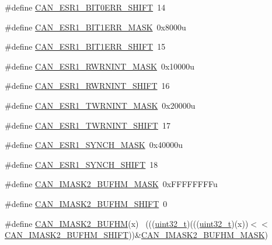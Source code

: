 \begin{DoxyCompactItemize}
\item 
\#define \hyperlink{group___c_a_n___register___masks_ga949e83e6333f8b4ddd5b2fb77585e2e9}{C\+A\+N\+\_\+\+E\+S\+R1\+\_\+\+B\+I\+T0\+E\+R\+R\+\_\+\+S\+H\+I\+FT}~14
\item 
\#define \hyperlink{group___c_a_n___register___masks_ga8a260202c5a157354042a1fba8cbc882}{C\+A\+N\+\_\+\+E\+S\+R1\+\_\+\+B\+I\+T1\+E\+R\+R\+\_\+\+M\+A\+SK}~0x8000u
\item 
\#define \hyperlink{group___c_a_n___register___masks_ga2118504746ecc7ba810d5ed44dd7c31f}{C\+A\+N\+\_\+\+E\+S\+R1\+\_\+\+B\+I\+T1\+E\+R\+R\+\_\+\+S\+H\+I\+FT}~15
\item 
\#define \hyperlink{group___c_a_n___register___masks_gaf0e71745a764581c68a93feef2db8602}{C\+A\+N\+\_\+\+E\+S\+R1\+\_\+\+R\+W\+R\+N\+I\+N\+T\+\_\+\+M\+A\+SK}~0x10000u
\item 
\#define \hyperlink{group___c_a_n___register___masks_gafcbf44277d9766061369a79e2ff761a2}{C\+A\+N\+\_\+\+E\+S\+R1\+\_\+\+R\+W\+R\+N\+I\+N\+T\+\_\+\+S\+H\+I\+FT}~16
\item 
\#define \hyperlink{group___c_a_n___register___masks_gaf6b96813ed300d4649d7daec40351861}{C\+A\+N\+\_\+\+E\+S\+R1\+\_\+\+T\+W\+R\+N\+I\+N\+T\+\_\+\+M\+A\+SK}~0x20000u
\item 
\#define \hyperlink{group___c_a_n___register___masks_ga651c6aee47d004060a9dbc10369cf784}{C\+A\+N\+\_\+\+E\+S\+R1\+\_\+\+T\+W\+R\+N\+I\+N\+T\+\_\+\+S\+H\+I\+FT}~17
\item 
\#define \hyperlink{group___c_a_n___register___masks_ga908135f00230ede2890a9db408908d34}{C\+A\+N\+\_\+\+E\+S\+R1\+\_\+\+S\+Y\+N\+C\+H\+\_\+\+M\+A\+SK}~0x40000u
\item 
\#define \hyperlink{group___c_a_n___register___masks_ga2bd04d8052247b76f7bde4e6d936c0ac}{C\+A\+N\+\_\+\+E\+S\+R1\+\_\+\+S\+Y\+N\+C\+H\+\_\+\+S\+H\+I\+FT}~18
\item 
\#define \hyperlink{group___c_a_n___register___masks_ga9a609dcb1bca8001d83d0c6e4606a454}{C\+A\+N\+\_\+\+I\+M\+A\+S\+K2\+\_\+\+B\+U\+F\+H\+M\+\_\+\+M\+A\+SK}~0x\+F\+F\+F\+F\+F\+F\+F\+Fu
\item 
\#define \hyperlink{group___c_a_n___register___masks_ga0d2a12288f44224a38a4d784903838bb}{C\+A\+N\+\_\+\+I\+M\+A\+S\+K2\+\_\+\+B\+U\+F\+H\+M\+\_\+\+S\+H\+I\+FT}~0
\item 
\#define \hyperlink{group___c_a_n___register___masks_ga7842e9875d6cdb9f94beb0ce81cc5f95}{C\+A\+N\+\_\+\+I\+M\+A\+S\+K2\+\_\+\+B\+U\+F\+HM}(x)                                        ~(((\hyperlink{_p_e___types_8h_a33594304e786b158f3fb30289278f5af}{uint32\+\_\+t})(((\hyperlink{_p_e___types_8h_a33594304e786b158f3fb30289278f5af}{uint32\+\_\+t})(x))$<$$<$\hyperlink{group___c_a_n___register___masks_ga0d2a12288f44224a38a4d784903838bb}{C\+A\+N\+\_\+\+I\+M\+A\+S\+K2\+\_\+\+B\+U\+F\+H\+M\+\_\+\+S\+H\+I\+FT}))\&\hyperlink{group___c_a_n___register___masks_ga9a609dcb1bca8001d83d0c6e4606a454}{C\+A\+N\+\_\+\+I\+M\+A\+S\+K2\+\_\+\+B\+U\+F\+H\+M\+\_\+\+M\+A\+SK})
$$
\end{DoxyCompactItemize}
